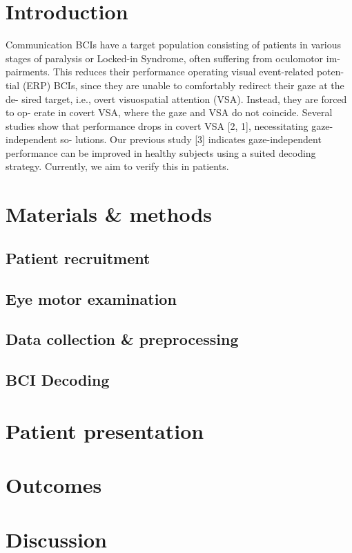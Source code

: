 \section{Introduction}

Communication BCIs have a target population consisting of patients in various
stages of paralysis or Locked-in Syndrome, often suffering from oculomotor im-
pairments. This reduces their performance operating visual event-related poten-
tial (ERP) BCIs, since they are unable to comfortably redirect their gaze at the de-
sired target, i.e., overt visuospatial attention (VSA). Instead, they are forced to op-
erate in covert VSA, where the gaze and VSA do not coincide. Several studies show
that performance drops in covert VSA [2, 1], necessitating gaze-independent so-
lutions. Our previous study [3] indicates gaze-independent performance can be
improved in healthy subjects using a suited decoding strategy. Currently, we aim
to verify this in patients.

\section{Materials \& methods}
\subsection{Patient recruitment}
\subsection{Eye motor examination}
\subsection{Data collection \& preprocessing}
\subsection{BCI Decoding}
\section{Patient presentation}
\section{Outcomes}
\section{Discussion}
